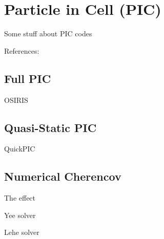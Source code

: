 %
%

\chapter{Particle in Cell (PIC)}
\label{Apx:PIC}

Some stuff about PIC codes

References: \cite{hatzky:2010,vay:2016}

\section{Full PIC}
\label{PIC:Full}
OSIRIS \cite{fonseca:2002, add:fonseca:2017}


\section{Quasi-Static PIC}
\label{PIC:QS}
QuickPIC \cite{an:2013, huang:2006}


\section{Numerical Cherencov}
\label{PIC:NumCher}

The effect \cite{godfrey:1974, greenwood:2004}

Yee solver \cite{yee:1966}

Lehe solver \cite{lehe:2013}
